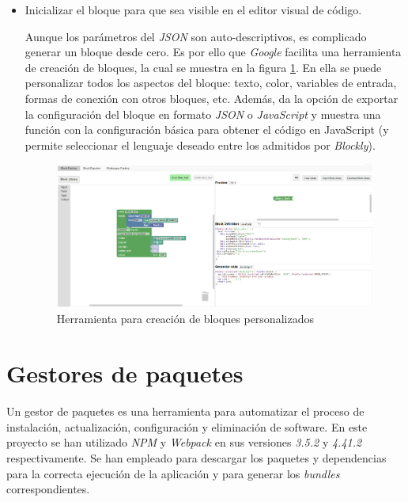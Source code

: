 \begin{itemize}
    \item Inicializar el bloque para que sea visible en el editor visual de código. 
    
    Aunque los parámetros del \textit{JSON} son auto-descriptivos, es complicado generar un bloque desde cero. Es por ello que \textit{Google} facilita  una herramienta de creación de bloques, la cual se muestra en la figura \ref{fig:googleTool}. 
    En ella se puede personalizar todos los aspectos del bloque: texto, color, variables de entrada, formas de conexión con otros bloques, etc.
    Además, da la opción de exportar la configuración del bloque en formato \textit{JSON} o \textit{JavaScript} y muestra una función con la configuración básica para obtener el código en JavaScript (y permite seleccionar el lenguaje deseado entre los admitidos por \textit{Blockly}).
    
    \begin{figure}[H]
    \centering
    \includegraphics[width=1.1\textwidth]{img/GoogleTool.png}
    \caption{Herramienta para creación de bloques personalizados} \label{fig:googleTool}
    \end{figure}
    
\end{itemize}

\section{Gestores de paquetes}
\label{sec:gest}
Un gestor de paquetes es una herramienta para automatizar el proceso de instalación, actualización, configuración y eliminación de software. En este proyecto se han utilizado \textit{NPM} y \textit{Webpack} en sus versiones \textit{3.5.2} y \textit{4.41.2} respectivamente. Se han empleado para descargar los paquetes y dependencias para la correcta ejecución de la aplicación y para generar los \textit{bundles} correspondientes. 

